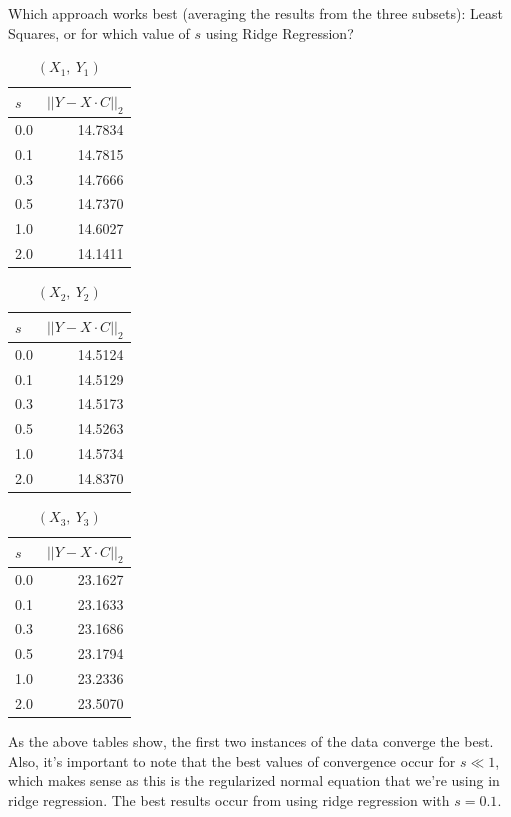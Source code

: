 \documentclass[11pt]{article}
\begin{document}
Which approach works best (averaging the results from the three subsets): Least Squares, or for which value of $s$ using Ridge Regression?  

\begin{table}[H]
\centering
\caption{$(X_{1},\ Y_{1})$}
\begin{tabular}{@{}l r@{}}
\hline\hline
$s$ & $\left|\left| Y - X\cdot C\right|\right|_{2}$\\
\hline
0.0 & 14.7834 \\
0.1 & 14.7815 \\
0.3 & 14.7666 \\
0.5 & 14.7370 \\
1.0 & 14.6027 \\
2.0 & 14.1411 \\
\hline
\end{tabular}
\end{table}

\begin{table}[H]
\centering
\caption{$(X_{2},\ Y_{2})$}
\begin{tabular}{@{}l r@{}}
\hline\hline
$s$ & $\left|\left| Y - X\cdot C\right|\right|_{2}$\\
\hline
0.0 & 14.5124 \\
0.1 & 14.5129 \\
0.3 & 14.5173 \\
0.5 & 14.5263 \\
1.0 & 14.5734 \\
2.0 & 14.8370 \\
\hline
\end{tabular}
\end{table}

\begin{table}[H]
\centering
\caption{$(X_{3},\ Y_{3})$}
\begin{tabular}{@{}l r@{}}
\hline\hline
$s$ & $\left|\left| Y - X\cdot C\right|\right|_{2}$\\
\hline
0.0 & 23.1627 \\
0.1 & 23.1633 \\
0.3 & 23.1686 \\
0.5 & 23.1794 \\
1.0 & 23.2336 \\
2.0 & 23.5070 \\
\hline
\end{tabular}
\end{table}

As the above tables show, the first two instances of the data converge the best. Also, it's important to note that the best values of convergence occur for $s \ll 1$, which makes sense as this is the regularized normal equation that we're using in ridge regression. The best results occur from using ridge regression with $s = 0.1$.

\end{document}
